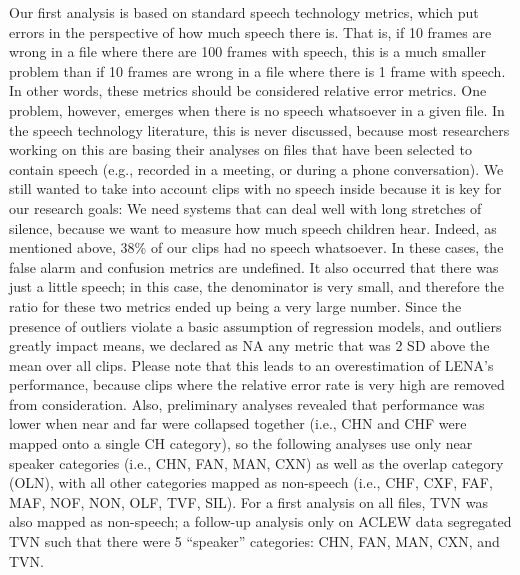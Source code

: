 \documentclass[english,floatsintext,man]{apa6}
\begin{document}
Our first analysis is based on standard speech technology metrics, which
put errors in the perspective of how much speech there is. That is, if
10 frames are wrong in a file where there are 100 frames with speech,
this is a much smaller problem than if 10 frames are wrong in a file
where there is 1 frame with speech. In other words, these metrics should
be considered relative error metrics. One problem, however, emerges when
there is no speech whatsoever in a given file. In the speech technology
literature, this is never discussed, because most researchers working on
this are basing their analyses on files that have been selected to
contain speech (e.g., recorded in a meeting, or during a phone
conversation). We still wanted to take into account clips with no speech
inside because it is key for our research goals: We need systems that
can deal well with long stretches of silence, because we want to measure
how much speech children hear. Indeed, as mentioned above, 38\% of our
clips had no speech whatsoever. In these cases, the false alarm and
confusion metrics are undefined. It also occurred that there was just a
little speech; in this case, the denominator is very small, and
therefore the ratio for these two metrics ended up being a very large
number. Since the presence of outliers violate a basic assumption of
regression models, and outliers greatly impact means, we declared as NA
any metric that was 2 SD above the mean over all clips. Please note that
this leads to an overestimation of LENA's performance, because clips
where the relative error rate is very high are removed from
consideration. Also, preliminary analyses revealed that performance was
lower when near and far were collapsed together (i.e., CHN and CHF were
mapped onto a single CH category), so the following analyses use only
near speaker categories (i.e., CHN, FAN, MAN, CXN) as well as the
overlap category (OLN), with all other categories mapped as non-speech
(i.e., CHF, CXF, FAF, MAF, NOF, NON, OLF, TVF, SIL). For a first
analysis on all files, TVN was also mapped as non-speech; a follow-up
analysis only on ACLEW data segregated TVN such that there were 5
\enquote{speaker} categories: CHN, FAN, MAN, CXN, and TVN.
\end{document}
